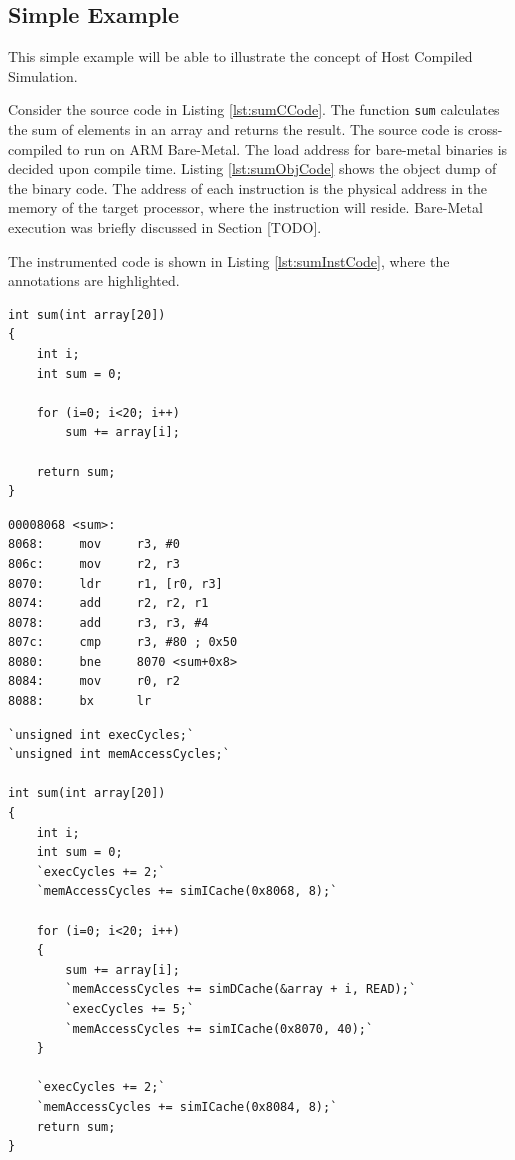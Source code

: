 \subsection{Simple Example}
This simple example will be able to illustrate the concept of Host Compiled Simulation.

Consider the source code in Listing \ref{lst:sumCCode}. The function \texttt{sum} calculates the sum of elements in an array and returns the result. The source code is cross-compiled to run on ARM Bare-Metal. The load address for bare-metal binaries is decided upon compile time. Listing \ref{lst:sumObjCode} shows the object dump of the binary code. The address of each instruction is the physical address in the memory of the target processor, where the instruction will reside. Bare-Metal execution was briefly discussed in Section [TODO].

The instrumented code is shown in Listing \ref{lst:sumInstCode}, where the annotations are highlighted.

\begin{minipage}{0.5\textwidth}
\begin{lstlisting}[caption={Simple C Code},label={lst:sumCCode}]
int sum(int array[20])
{
	int i;
	int sum = 0;
	
	for (i=0; i<20; i++)
		sum += array[i];
	
	return sum;
}
\end{lstlisting}
\end{minipage}%
\begin{minipage}{0.5\textwidth}
\begin{lstlisting}[caption={Objdump Code},label={lst:sumObjCode}]
00008068 <sum>:
8068:     mov     r3, #0
806c:     mov     r2, r3
8070:     ldr     r1, [r0, r3]
8074:     add     r2, r2, r1
8078:     add     r3, r3, #4
807c:     cmp     r3, #80 ; 0x50
8080:     bne     8070 <sum+0x8>
8084:     mov     r0, r2
8088:     bx      lr
\end{lstlisting}
\end{minipage}

\begin{lstlisting}[caption={Instrumented Code},label={lst:sumInstCode}]
`unsigned int execCycles;`
`unsigned int memAccessCycles;`

int sum(int array[20])
{
	int i;
	int sum = 0;
	`execCycles += 2;`
	`memAccessCycles += simICache(0x8068, 8);`
	
	for (i=0; i<20; i++)
	{
		sum += array[i];
		`memAccessCycles += simDCache(&array + i, READ);`
		`execCycles += 5;`
		`memAccessCycles += simICache(0x8070, 40);`
	}
	
	`execCycles += 2;`
	`memAccessCycles += simICache(0x8084, 8);`
	return sum;
}
\end{lstlisting}

